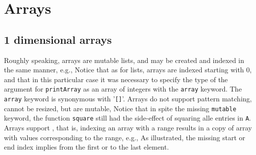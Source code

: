 \section{Arrays}
\subsection{1 dimensional arrays}
Roughly speaking, arrays are mutable lists, and may be created and indexed in the same manner, e.g.,
Notice that as for lists, arrays are indexed starting with 0, and that in this particular case it was necessary to specify the type of the argument for \texttt{printArray} as an array of integers with the \texttt{array} keyword. The \texttt{array} keyword is synonymous with '\verb|[]|'. Arrays do not support pattern matching, cannot be resized, but are mutable,
Notice that in spite the missing \texttt{mutable} keyword, the function \texttt{square} still had the side-effect of squaring alle entries in \texttt{A}. Arrays support , that is, indexing an array with a range results in a copy of array with values corresponding to the range, e.g.,
As illustrated, the missing start or end index implies from the first or to the last element.

